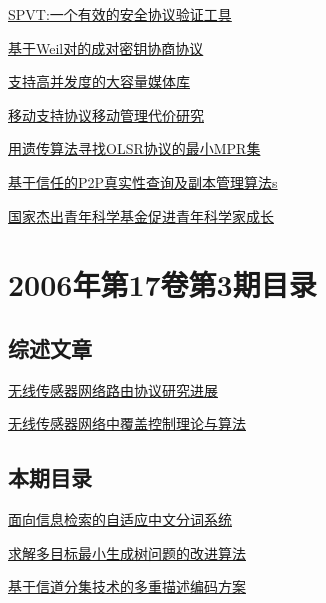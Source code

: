 \documentclass[a4paper]{article}
\begin{document}
\href{http://www.jos.org.cn/ch/reader/download_pdf.aspx?file_no=20060427&year_id=2006&quarter_id=4&falg=1}{SPVT:一个有效的安全协议验证工具}

\href{http://www.jos.org.cn/ch/reader/download_pdf.aspx?file_no=20060428&year_id=2006&quarter_id=4&falg=1}{基于Weil对的成对密钥协商协议}

\href{http://www.jos.org.cn/ch/reader/download_pdf.aspx?file_no=20060429&year_id=2006&quarter_id=4&falg=1}{支持高并发度的大容量媒体库}

\href{http://www.jos.org.cn/ch/reader/download_pdf.aspx?file_no=20060430&year_id=2006&quarter_id=4&falg=1}{移动支持协议移动管理代价研究}

\href{http://www.jos.org.cn/ch/reader/download_pdf.aspx?file_no=20060431&year_id=2006&quarter_id=4&falg=1}{用遗传算法寻找OLSR协议的最小MPR集}

\href{http://www.jos.org.cn/ch/reader/download_pdf.aspx?file_no=20060432&year_id=2006&quarter_id=4&falg=1}{基于信任的P2P真实性查询及副本管理算法s}

\href{http://www.jos.org.cn/ch/reader/download_pdf.aspx?file_no=20060433&year_id=2006&quarter_id=4&falg=1}{国家杰出青年科学基金促进青年科学家成长}


\section{\textbf{2006年第17卷第3期目录}}
\subsection{综述文章}
\href{http://www.jos.org.cn/ch/reader/download_pdf.aspx?file_no=20060309&year_id=2006&quarter_id=3&falg=1}{无线传感器网络路由协议研究进展}

\href{http://www.jos.org.cn/ch/reader/download_pdf.aspx?file_no=20060310&year_id=2006&quarter_id=3&falg=1}{无线传感器网络中覆盖控制理论与算法}

\subsection{本期目录}
\href{http://www.jos.org.cn/ch/reader/download_pdf.aspx?file_no=20060302&year_id=2006&quarter_id=3&falg=1}{面向信息检索的自适应中文分词系统}

\href{http://www.jos.org.cn/ch/reader/download_pdf.aspx?file_no=20060303&year_id=2006&quarter_id=3&falg=1}{求解多目标最小生成树问题的改进算法}

\href{http://www.jos.org.cn/ch/reader/download_pdf.aspx?file_no=20060304&year_id=2006&quarter_id=3&falg=1}{基于信道分集技术的多重描述编码方案}
\end{document}

